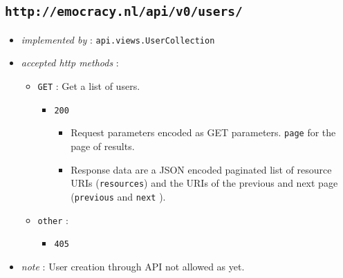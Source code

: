 \documentclass[a4paper]{report}
\begin{document}
\subsection{\texttt{http://emocracy.nl/api/v0/users/}}
\begin{itemize}
    \item{\textsl{implemented by} : \texttt{api.views.UserCollection}}
    \item{\textsl{accepted http methods} :
        \begin{itemize}
            \item{\texttt{GET} : Get a list of users.
                \begin{itemize}
                    \item{\texttt{200}
                    \begin{itemize}
                        \item{Request parameters encoded as GET parameters. 
                        \texttt{page} for the page of results.}
                        \item{Response data are a JSON encoded paginated list of 
                        resource URIs (\texttt{resources}) and the URIs of the 
                        previous and next page (\texttt{previous} and \texttt{next}
                        ).}
                    \end{itemize}
                    }
                \end{itemize}
            }
            \item{\texttt{other} :
                \begin{itemize}
                    \item{\texttt{405}}
                \end{itemize}
            }
        \end{itemize}
    }
    \item{\textsl{note} : User creation through API not allowed as yet.}
\end{itemize}
\end{document}
